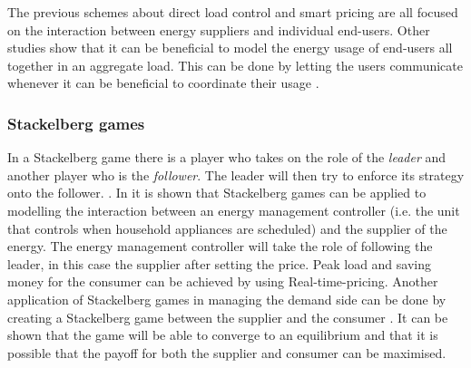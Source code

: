 The previous schemes about direct load control and smart pricing are all focused on the interaction between energy suppliers and individual end-users. Other studies show \cite{Mohsenian-RadWongJatskevichEtAl2010a} that it can be beneficial to model the energy usage of end-users all together in an aggregate load. This can be done by letting the users communicate whenever it can be beneficial to coordinate their usage \cite{Mohsenian-RadWongJatskevichEtAl2010a}. 

   
\subsubsection{Stackelberg games}
In a Stackelberg game there is a player who takes on the role of the \textit{leader} and another player who is the \textit{follower}. The leader will then try to enforce its strategy onto the follower. \cite{ShohamLeyton-Brown2008}.
In \cite{ChenKishoreSnyder2011} it is shown that Stackelberg games can be applied to modelling the interaction between an energy management controller (i.e. the unit that controls when household appliances are scheduled) and the supplier of the energy. The energy management controller will take the role of following the leader, in this case the supplier after setting the price. Peak load and saving money for the consumer can be achieved by using Real-time-pricing. Another application of Stackelberg games in managing the demand side can be done by creating a Stackelberg game between the supplier and the consumer \cite{MaharjanZhuZhangEtAl2013}. It can be shown that the game will be able to converge to an equilibrium and that it is possible that the payoff for both the supplier and consumer can be maximised.


